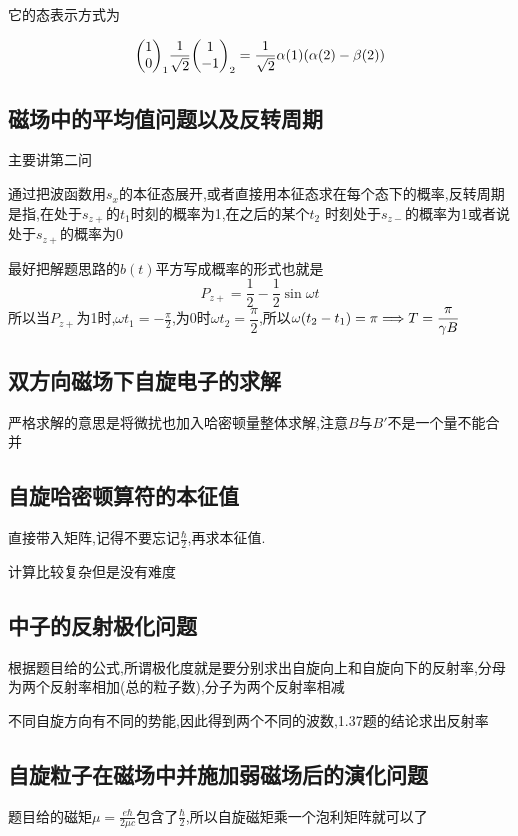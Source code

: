             它的态表示方式为

            $$
            \mqty(1 \\ 0)_{1} \frac{1}{\sqrt{2}}\mqty(1 \\ -1)_{2} = \frac{1}{\sqrt{2}} \alpha(1)(\alpha(2) - \beta(2))
            $$

        \subsection{磁场中的平均值问题以及反转周期}
            主要讲第二问

            通过把波函数用$s_{x}$的本征态展开,或者直接用本征态求在每个态下的概率,反转周期是指,在处于$s_{z+}$的$t_{1}$时刻的概率为1,在之后的某个$t_{2}$
            时刻处于$s_{z-}$的概率为1或者说处于$s_{z+}$的概率为0
            
            最好把解题思路的$b(t)$平方写成概率的形式也就是
            $$
            P_{z+} = \frac{1}{2} - \frac{1}{2}\sin{\omega t}
            $$
            所以当$P_{z+}$为1时,$ \omega t_{1} = - \frac{\pi}{2}$,为0时$\omega t_{2} = \dfrac{\pi}{2}$,所以$\omega(t_{2} - t_{1}) = \pi  \Longrightarrow T = \dfrac{\pi}{\gamma B}$


        \subsection{双方向磁场下自旋电子的求解}
            严格求解的意思是将微扰也加入哈密顿量整体求解,注意$B$与$B'$不是一个量不能合并

        \subsection{自旋哈密顿算符的本征值}
            直接带入矩阵,记得不要忘记$\frac{\hbar}{2}$,再求本征值.

            计算比较复杂但是没有难度

        \subsection{中子的反射极化问题}
            根据题目给的公式,所谓极化度就是要分别求出自旋向上和自旋向下的反射率,分母为两个反射率相加(总的粒子数),分子为两个反射率相减

            不同自旋方向有不同的势能,因此得到两个不同的波数,1.37题的结论求出反射率

        \subsection{自旋粒子在磁场中并施加弱磁场后的演化问题}
            题目给的磁矩$\mu = \frac{e \hbar}{2 \mu c}$包含了$\frac{\hbar}{2}$,所以自旋磁矩乘一个泡利矩阵就可以了


